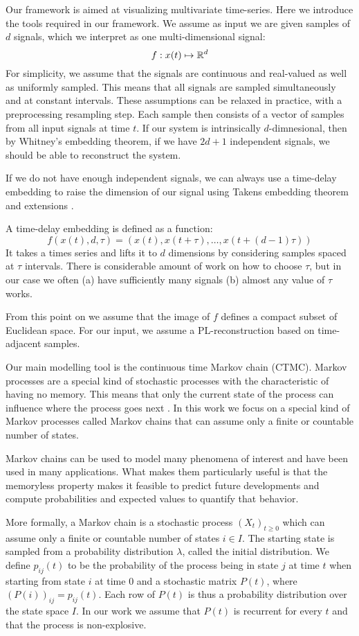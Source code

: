 \label{sec:preliminaries}
Our framework is aimed at visualizing multivariate time-series. Here we introduce the tools required in our framework. We assume as input we are given samples of $d$ signals, which we interpret as one multi-dimensional signal:
$$f: x(t)\mapsto \mathbb{R}^d$$
For simplicity, we assume that the signals are continuous and real-valued as well as uniformly sampled. This means that all signals are sampled simultaneously and at constant intervals. These assumptions can be relaxed in practice, with a preprocessing resampling step.  Each sample then consists of a vector of samples from all input signals at time $t$. If our system is intrinsically $d$-dimnesional, then by Whitney's embedding theorem, if we have $2d+1$ independent signals, we should be able to reconstruct the system.

If we do not have enough independent signals, we can always use a time-delay embedding to raise the dimension of our signal using Takens embedding theorem \cite{} and extensions \cite{}.  

A time-delay embedding is defined as a function:
$$ f(x(t),d,\tau) = (x(t),x(t+\tau),\ldots,x(t+(d-1)\tau) )$$
It takes a times series and lifts it to $d$ dimensions by considering samples spaced at $\tau$ intervals. There is considerable amount of work on how to choose $\tau$, but in our case we often (a) have sufficiently many signals (b) almost any value of $\tau$ works. 

From this point on we  assume that the image of $f$ defines a compact subset of Euclidean space. For our input, we assume a PL-reconstruction based on time-adjacent samples. 

Our main modelling tool is the continuous time Markov chain (CTMC). Markov processes are a special kind of stochastic processes with the characteristic of  	having no memory. This means that only the current state of the process can influence	where the process goes next \cite{norris1998markov}. In this work we focus on a special kind
	of Markov processes called Markov chains that can assume only a finite or countable
	number of states.

Markov chains can be used to model many phenomena of interest and have been used in many
applications. What makes them particularly useful is that the memoryless
property makes it feasible to predict future developments and compute probabilities and
expected values to quantify that behavior.

More formally, a Markov chain is a stochastic process $(X_t)_{t \ge 0}$ which can assume 
only a finite or countable number of states $i \in I$. The starting state
is sampled from a probability distribution $\lambda$, called the initial distribution.
We define $p_{ij}(t)$ to be the probability of the process being in state $j$ at time $t$
when starting from state $i$ at time $0$ and a stochastic matrix $P(t)$, where $\left(P(i)\right)_{ij} = p_{ij}(t)$.
Each row of $P(t)$ is thus a probability distribution over the state space $I$. In our
work we assume that $P(t)$ is recurrent for every $t$ and that the process is non-explosive.


